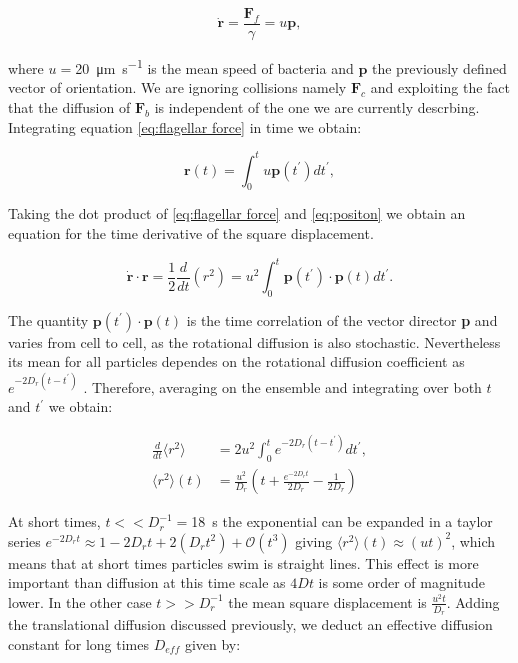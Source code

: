 \begin{equation} \label{eq:flagellar force}
	 \dot{\textbf{r}} =\frac{\textbf{F}_f}{\gamma} = u \textbf{p},
\end{equation}

where $u=$\SI[per-mode = symbol]{20}{\micro\meter \per \second} is the mean speed of bacteria and $\textbf{p}$ the previously defined vector of orientation. We are ignoring collisions namely $\textbf{F}_c$ and exploiting the fact that the diffusion of $\textbf{F}_b$ is independent of the one we are currently descrbing. Integrating equation \eqref{eq:flagellar force} in time we obtain:

\begin{equation} \label{eq:positon}
	\textbf{r}(t) = \int_0^t u \textbf{p}(t^\prime)dt^\prime,
\end{equation}

Taking the dot product of \eqref{eq:flagellar force} and \eqref{eq:positon} we obtain an equation for the time derivative of the square displacement.

\begin{equation} 
	\dot{\textbf{r}} \cdot \textbf{r} = \frac{1}{2}\frac{d}{dt} (r^2) = u^2 \int_0^t  \textbf{p}(t^\prime) \cdot \textbf{p}(t)dt^\prime.
\end{equation}

The quantity $\textbf{p}(t^\prime) \cdot \textbf{p}(t)$ is the time correlation of the vector director \textbf{p} and varies from cell to cell, as the rotational diffusion is also stochastic. Nevertheless its mean for all particles dependes on the rotational diffusion coefficient as $e^{-2D_r(t-t^\prime)}$ \cite{Lauga2020TheMotility}. Therefore, averaging on the ensemble and integrating over both $t$ and $t^\prime$ we obtain:


\begin{align} 
    \frac{d}{dt} \langle r^2 \rangle &= 2u^2 \int_0^t e^{-2D_r(t-t^\prime)}dt^\prime, \\
    \langle r^2 \rangle (t) &= \frac{u^2}{D_r}\left( t + \frac{e^{-2D_rt}}{2D_r} - \frac{1}{2D_r} \right)
\end{align}

At short times,  $t << D_r^{-1} =$\SI{18}{\second} the exponential can be expanded in a taylor series $e^{-2D_rt}\approx 1 - 2D_rt + 2(D_r t^2) + \mathcal{O}(t^3)$ giving $\langle r^2 \rangle (t)  \approx (ut)^2$, which means that at short times particles swim is straight lines. This effect is more important than diffusion at this time scale as $4Dt$ is some order of magnitude lower. In the other case $t >> D_r^{-1}$ the mean square displacement is $\frac{u^2t}{D_r}$. Adding the translational diffusion discussed previously, we deduct an effective diffusion constant for long times $D_{eff}$ given by:

